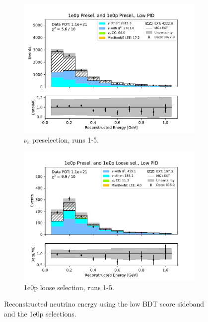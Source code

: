 \begin{figure}[H]
\begin{subfigure}{0.5\linewidth}
        \includegraphics[width=\linewidth]{technote/Sidebands/Figures/FarSideband/far_sideband_reco_e_run1234b4c4d5_ZP_ZP_LOW_PID.pdf}
        \caption{$\nu_e$ preselection, runs 1-5.}
    \end{subfigure}%
    \begin{subfigure}{0.5\linewidth}
        \includegraphics[width=\linewidth]{technote/Sidebands/Figures/FarSideband/far_sideband_reco_e_run1234b4c4d5_ZP_ZPLOOSESEL_LOW_PID.pdf}
        \caption{1e0p loose selection, runs 1-5.}
    \end{subfigure}
    \caption{Reconstructed neutrino energy using the low BDT score sideband and the 1e0p selections.}
\end{figure}
